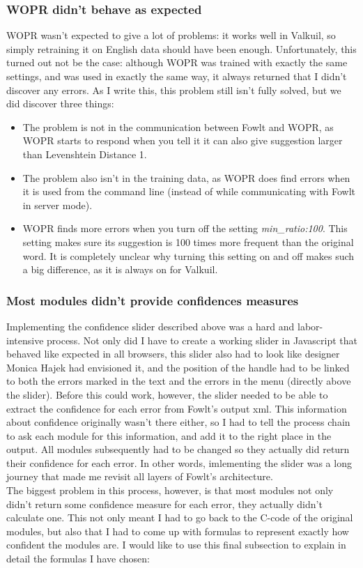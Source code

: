 \documentclass[12pt]{article}
\begin{document}
\subsubsection{WOPR didn't behave as expected}
WOPR wasn't expected to give a lot of problems: it works well in Valkuil, so simply retraining it on English data should have been enough. Unfortunately, this turned out not be the case: although WOPR was trained with exactly the same settings, and was used in exactly the same way, it always returned that I didn't discover any errors. As I write this, this problem still isn't fully solved, but we did discover three things: 

\begin{itemize}

\item The problem is not in the communication between Fowlt and WOPR, as WOPR starts to respond when you tell it it can also give suggestion larger than Levenshtein Distance 1.
\item The problem also isn't in the training data, as WOPR does find errors when it is used from the command line (instead of while communicating with Fowlt in server mode).
\item WOPR finds more errors when you turn off the setting \emph{min\_ratio:100}. This setting makes sure its suggestion is 100 times more frequent than the original word. It is completely unclear why turning this setting on and off makes such a big difference, as it is always on for Valkuil.

\end{itemize}

\subsubsection{Most modules didn't provide confidences measures} \label{formulas}
Implementing the confidence slider described above was a hard and labor-intensive process. Not only did I have to create a working slider in Javascript that behaved like expected in all browsers, this slider also had to look like designer Monica Hajek had envisioned it, and the position of the handle had to be linked to both the errors marked in the text and the errors in the menu (directly above the slider). Before this could work, however, the slider needed to be able to extract the confidence for each error from Fowlt's output xml. This information about confidence originally wasn't there either, so I had to tell the process chain to ask each module for this information, and add it to the right place in the output. All modules subsequently had to be changed so they actually did return their confidence for each error. In other words, imlementing the slider was a long journey that made me revisit all layers of Fowlt's architecture.\\\indent
The biggest problem in this process, however, is that most modules not only didn't return some confidence measure for each error, they actually didn't calculate one. This not only meant I had to go back to the C-code of the original modules, but also that I had to come up with formulas to represent exactly how confident the modules are. I would like to use this final subsection to explain in detail the formulas I have chosen:
\end{document}
